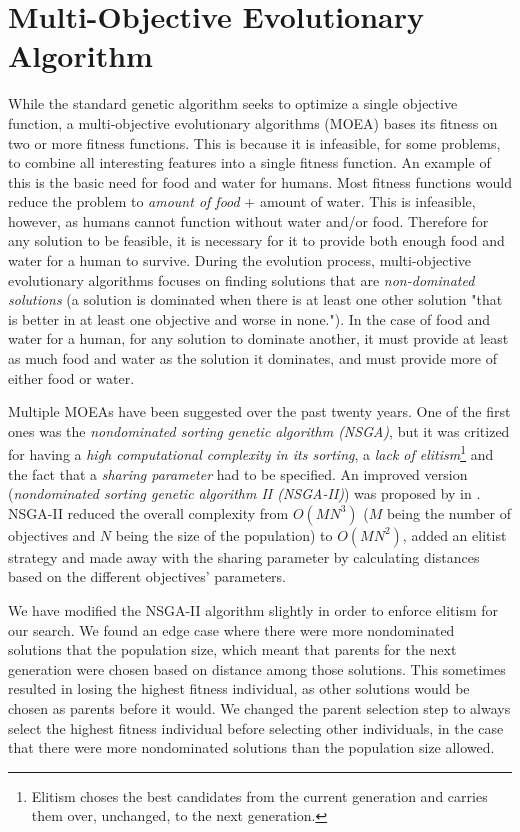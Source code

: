 \section{Multi-Objective Evolutionary Algorithm}
\label{methodology_moea}
While the standard genetic algorithm seeks to optimize a single objective function, a multi-objective evolutionary algorithms (MOEA) bases its fitness on two or more fitness functions. This is because it is infeasible, for some problems, to combine all interesting features into a single fitness function. An example of this is the basic need for food and water for humans. Most fitness functions would reduce the problem to \textit{amount of food} + {amount of water}. This is infeasible, however, as humans cannot function without water and/or food. Therefore for any solution to be feasible, it is necessary for it to provide both enough food and water for a human to survive. During the evolution process, multi-objective evolutionary algorithms focuses on finding solutions that are \textit{non-dominated solutions} (a solution is dominated when there is at least one other solution "that is better in at least one objective and worse in none."\cite{Togelius2013Controllable}). In the case of food and water for a human, for any solution to dominate another, it must provide at least as much food and water as the solution it dominates, and must provide more of either food or water.

Multiple MOEAs have been suggested over the past twenty years\cite{Deb2001Multi, Fonseca1993Genetic, Srinivas1994Muiltiobjective}. One of the first ones was the \textit{nondominated sorting genetic algorithm (NSGA)}\cite{Srinivas1994Muiltiobjective}, but it was critized for having a \textit{high computational complexity in its sorting}, a \textit{lack of elitism}\footnote{Elitism choses the best candidates from the current generation and carries them over, unchanged, to the next generation.} and the fact that a \textit{sharing parameter} had to be specified. An improved version (\textit{nondominated sorting genetic algorithm II (NSGA-II)}) was proposed by \citeauthor{Deb2000Fast}\cite{Deb2000Fast} in \citeyear{Deb2000Fast}. NSGA-II reduced the overall complexity from $O(M N^3)$ ($M$ being the number of objectives and $N$ being the size of the population) to $O(M N^2)$, added an elitist strategy and made away with the sharing parameter by calculating distances based on the different objectives' parameters.

We have modified the NSGA-II algorithm slightly in order to enforce elitism for our search. We found an edge case where there were more nondominated solutions that the population size, which meant that parents for the next generation were chosen based on distance among those solutions. This sometimes resulted in losing the highest fitness individual, as other solutions would be chosen as parents before it would. We changed the parent selection step to always select the highest fitness individual before selecting other individuals, in the case that there were more nondominated solutions than the population size allowed.

